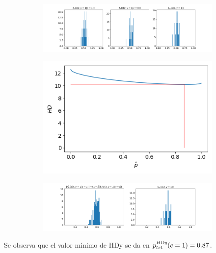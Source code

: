 \begin{figure}[h]
    \centering
    \begin{subfigure}[b]{\textwidth}
        \centering
        \includegraphics[width=\linewidth]{../plots_teoria/hdy_1.png}
    \end{subfigure}
    \begin{subfigure}[b]{0.4\textwidth}
        \centering
        \includegraphics[width=\linewidth]{../plots_teoria/hdy_2.png}
    \end{subfigure}
    \begin{subfigure}[b]{\textwidth}
        \centering
        \includegraphics[width=\linewidth]{../plots_teoria/hdy_3.png}
    \end{subfigure}
    \hfill
\end{figure}

Se observa que el valor mínimo de HDy se da en \(p^{\it HDy \/}_{tst}(c=1) =
0.87\).

